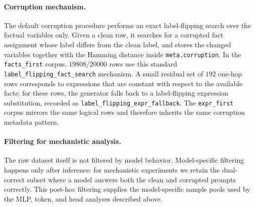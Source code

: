 \documentclass[11pt]{article}
\begin{document}
\paragraph{Corruption mechanism.}
The default corruption procedure performs an exact label-flipping search over the factual variables only. Given a clean row, it searches for a corrupted fact assignment whose label differs from the clean label, and stores the changed variables together with the Hamming distance inside \texttt{meta.corruption}. In the \texttt{facts\_first} corpus, $19808/20000$ rows use this standard \texttt{label\_flipping\_fact\_search} mechanism. A small residual set of $192$ one-hop rows corresponds to expressions that are constant with respect to the available facts; for these rows, the generator falls back to a label-flipping expression substitution, recorded as \texttt{label\_flipping\_expr\_fallback}. The \texttt{expr\_first} corpus mirrors the same logical rows and therefore inherits the same corruption metadata pattern.

\paragraph{Filtering for mechanistic analysis.}
The raw dataset itself is not filtered by model behavior. Model-specific filtering happens only after inference: for mechanistic experiments we retain the dual-correct subset where a model answers both the clean and corrupted prompts correctly. This post-hoc filtering supplies the model-specific sample pools used by the MLP, token, and head analyses described above.
\end{document}
